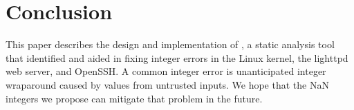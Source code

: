 \section{Conclusion}
\label{s:concl}

This paper describes the design and implementation of \sys, a static analysis
tool that identified and aided in fixing \nrbugs integer errors in the Linux
kernel, the lighttpd web server, and OpenSSH\@.  A common integer error is
unanticipated integer wraparound caused by values from untrusted inputs.  We
hope that the NaN integers we propose can mitigate that problem in the future.
